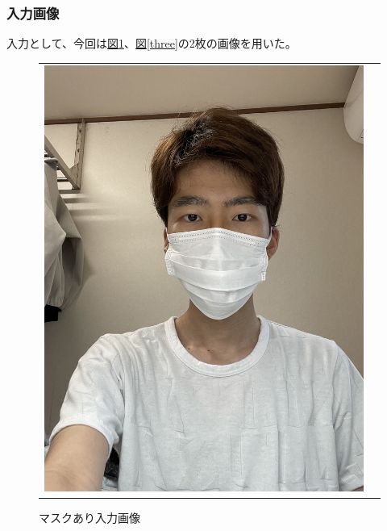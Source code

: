 \documentclass[]{jarticle}          %
\begin{document}
\subsubsection{入力画像}
入力として、今回は\hyperref[two]{図\ref{two}}、\hyperref[three]{図\ref{three}}の2枚の画像を用いた。
\begin{figure}[!ht]
  \begin{tabular}{cc}
    \begin{minipage}[t]{0.45\hsize}
      \centering
      \includegraphics[keepaspectratio, scale=0.1]{figures/mask.jpg}
      \caption{マスクあり入力画像}
      \label{two}
    \end{minipage} &
    \begin{minipage}[t]{0.45\hsize}
      \centering

\end{minipage}
\end{tabular}
\end{figure}
\end{document}
